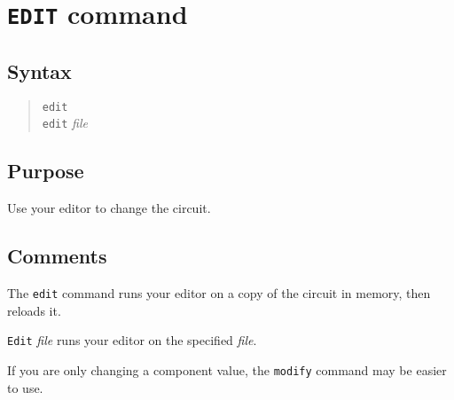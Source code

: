 %
%
%
%
\section{{\tt EDIT} command}
\subsection{Syntax}
\begin{verse}
{\tt edit} \\
{\tt edit} {\it file}
\end{verse}
\subsection{Purpose}

Use your editor to change the circuit.
\subsection{Comments}

The {\tt edit} command runs your editor on a copy of the circuit in memory, 
then reloads it.

{\tt Edit} {\it file} runs your editor on the specified {\it file}.

If you are only changing a component value, the {\tt modify} command may be
easier to use.

